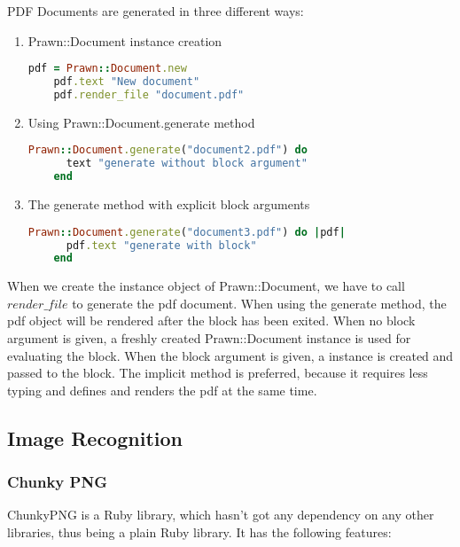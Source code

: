 PDF Documents are generated in three different ways:
\begin{enumerate}
  \item Prawn::Document instance creation
    \begin{lstlisting}[language=Ruby, caption={Prawn Document generation with instance creation}, label=ruby_prawn1]
    pdf = Prawn::Document.new
    pdf.text "New document"
    pdf.render_file "document.pdf"
    \end{lstlisting}

  \item Using Prawn::Document.generate method
    \begin{lstlisting}[language=Ruby, caption={Prawn Document generation with method}, label=ruby_prawn2]
    Prawn::Document.generate("document2.pdf") do 
      text "generate without block argument"
    end
    \end{lstlisting}

  \item The generate method with explicit block arguments
    \begin{lstlisting}[language=Ruby, caption={Prawn Document generation with block argument}, label=ruby_prawn3]
    Prawn::Document.generate("document3.pdf") do |pdf|
      pdf.text "generate with block"
    end
    \end{lstlisting}
\end{enumerate}

When we create the instance object of Prawn::Document, we have to call $render\_file$ to generate the pdf document. 
When using the generate method, the pdf object will be rendered after the block has been exited. When no block argument is given, a freshly created Prawn::Document instance is used for evaluating the block. When the block argument is given, a instance is created and passed to the block. The implicit method is preferred, because it requires less typing and defines and renders the pdf at the same time. 


\subsection{Image Recognition}

\subsubsection{Chunky PNG}

ChunkyPNG is a Ruby library, which hasn't got any dependency on any other libraries, thus being a plain Ruby library.
It has the following features:

